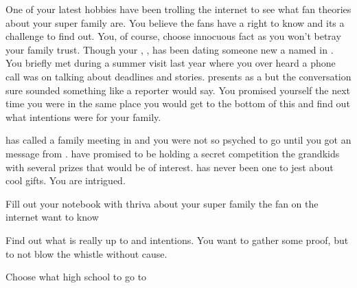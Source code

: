 \documentclass[char]{LRSguildcamp1}
\begin{document}
One of your latest hobbies have been trolling the internet to see what fan theories about your super family are. You believe the fans have a right to know and its a challenge to find out. You, of course, choose innocuous fact as you won't betray your family trust. Though your \cYoungest{\uncle}, \cYoungest{}, has been dating someone new a \cAS{\hero} named \cAS{} in \pCityYoungest{}. You briefly met \cAS{} during a summer visit last year where you over heard a phone call \cAS{\they} was on talking about deadlines and stories. \cAS{} presents as a \cAS{\hero} but the conversation sure sounded something like a reporter would say. You promised yourself the next time you were in the same place you would get to the bottom of this and find out what \cAS{\their} intentions were for your family.

\cGrandma{} has called a family meeting in \pCityGrandma{} and you were not so psyched to go until you got an message from \cGrandma{}. \cGrandma{\they} have promised to be holding a secret competition the grandkids with several prizes that would be of interest. \cGrandma{} has never been one to jest about cool gifts. You are intrigued.  


\begin{itemz}[Goals]
	\item Fill out your notebook with thriva about your super family the fan on the internet want to know
	\item Find out what \cAS{} is really up to and  intentions. You want to gather some proof, but to not blow the whistle without cause.
	\item Choose what high school to go to 
\end{itemz}
\end{document}
